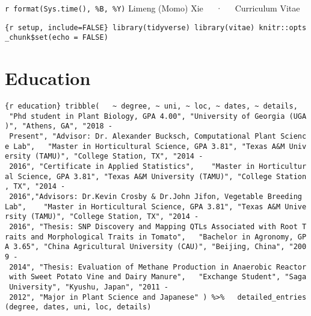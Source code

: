 \documentclass[11pt, a4paper]{awesome-cv}
\begin{document}
\makecvheader

\makecvfooter
  {\texttt{r\ format(Sys.time(),\ \textquotesingle{}\%B,\ \%Y\textquotesingle{})}}
    {Limeng (Momo) Xie~~~·~~~Curriculum Vitae}
  {\thepage}





\texttt{\{r\ setup,\ include=FALSE\}\ library(tidyverse)\ library(vitae)\ knitr::opts\_chunk\$set(echo\ =\ FALSE)}

\section{Education}\label{education}

\texttt{\{r\ education\}\ tribble(\ \ \ \textasciitilde{}\ degree,\ \textasciitilde{}\ uni,\ \textasciitilde{}\ loc,\ \textasciitilde{}\ dates,\ \textasciitilde{}\ details,\ \ \ "Phd\ student\ in\ Plant\ Biology,\ GPA\ 4.00",\ "University\ of\ Georgia\ (UGA)",\ "Athens,\ GA",\ "2018\ -\ Present",\ "Advisor:\ Dr.\ Alexander\ Bucksch,\ Computational\ Plant\ Science\ Lab",\ \ \ "Master\ in\ Horticultural\ Science,\ GPA\ 3.81",\ "Texas\ A\&M\ University\ (TAMU)",\ "College\ Station,\ TX",\ "2014\ -\ 2016",\ "Certificate\ in\ Applied\ Statistics",\ \ \ \ "Master\ in\ Horticultural\ Science,\ GPA\ 3.81",\ "Texas\ A\&M\ University\ (TAMU)",\ "College\ Station,\ TX",\ "2014\ -\ 2016","Advisors:\ Dr.Kevin\ Crosby\ \&\ Dr.John\ Jifon,\ Vegetable\ Breeding\ Lab",\ \ \ \ "Master\ in\ Horticultural\ Science,\ GPA\ 3.81",\ "Texas\ A\&M\ University\ (TAMU)",\ "College\ Station,\ TX",\ "2014\ -\ 2016",\ "Thesis:\ SNP\ Discovery\ and\ Mapping\ QTLs\ Associated\ with\ Root\ Traits\ and\ Morphological\ Traits\ in\ Tomato",\ \ \ "Bachelor\ in\ Agronomy,\ GPA\ 3.65",\ "China\ Agricultural\ University\ (CAU)",\ "Beijing,\ China",\ "2009\ -\ 2014",\ "Thesis:\ Evaluation\ of\ Methane\ Production\ in\ Anaerobic\ Reactor\ with\ Sweet\ Potato\ Vine\ and\ Dairy\ Manure",\ \ \ "Exchange\ Student",\ "Saga\ University",\ "Kyushu,\ Japan",\ "2011\ -\ 2012",\ "Major\ in\ Plant\textasciigrave{}\ Science\ and\ Japanese"\ )\ \%\textgreater{}\%\ \ \ detailed\_entries(degree,\ dates,\ uni,\ loc,\ details)}
\end{document}
